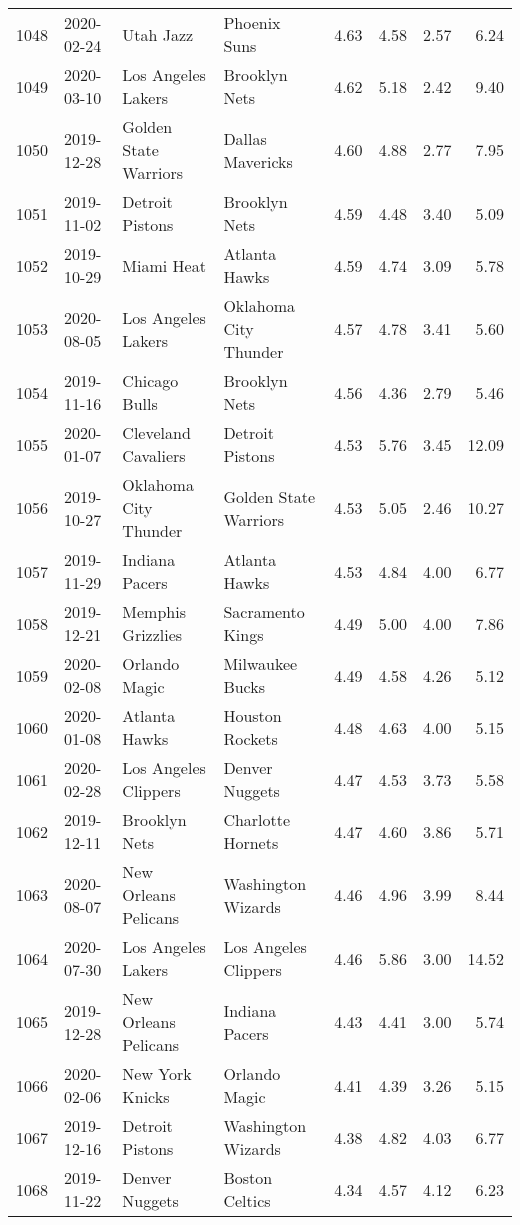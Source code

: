 \documentclass[
  11pt,
]{article}
\theoremstyle{nonumberplain}
\begin{document}
\begin{longtable}{rl|llr|rrr}
1048 & 2020-02-24 & Utah Jazz & Phoenix Suns & 4.63 & 4.58 & 2.57 & 6.24\\
1049 & 2020-03-10 & Los Angeles Lakers & Brooklyn Nets & 4.62 & 5.18 & 2.42 & 9.40\\
1050 & 2019-12-28 & Golden State Warriors & Dallas Mavericks & 4.60 & 4.88 & 2.77 & 7.95\\
1051 & 2019-11-02 & Detroit Pistons & Brooklyn Nets & 4.59 & 4.48 & 3.40 & 5.09\\
1052 & 2019-10-29 & Miami Heat & Atlanta Hawks & 4.59 & 4.74 & 3.09 & 5.78\\
1053 & 2020-08-05 & Los Angeles Lakers & Oklahoma City Thunder & 4.57 & 4.78 & 3.41 & 5.60\\
1054 & 2019-11-16 & Chicago Bulls & Brooklyn Nets & 4.56 & 4.36 & 2.79 & 5.46\\
1055 & 2020-01-07 & Cleveland Cavaliers & Detroit Pistons & 4.53 & 5.76 & 3.45 & 12.09\\
1056 & 2019-10-27 & Oklahoma City Thunder & Golden State Warriors & 4.53 & 5.05 & 2.46 & 10.27\\
1057 & 2019-11-29 & Indiana Pacers & Atlanta Hawks & 4.53 & 4.84 & 4.00 & 6.77\\
1058 & 2019-12-21 & Memphis Grizzlies & Sacramento Kings & 4.49 & 5.00 & 4.00 & 7.86\\
1059 & 2020-02-08 & Orlando Magic & Milwaukee Bucks & 4.49 & 4.58 & 4.26 & 5.12\\
1060 & 2020-01-08 & Atlanta Hawks & Houston Rockets & 4.48 & 4.63 & 4.00 & 5.15\\
1061 & 2020-02-28 & Los Angeles Clippers & Denver Nuggets & 4.47 & 4.53 & 3.73 & 5.58\\
1062 & 2019-12-11 & Brooklyn Nets & Charlotte Hornets & 4.47 & 4.60 & 3.86 & 5.71\\
1063 & 2020-08-07 & New Orleans Pelicans & Washington Wizards & 4.46 & 4.96 & 3.99 & 8.44\\
1064 & 2020-07-30 & Los Angeles Lakers & Los Angeles Clippers & 4.46 & 5.86 & 3.00 & 14.52\\
1065 & 2019-12-28 & New Orleans Pelicans & Indiana Pacers & 4.43 & 4.41 & 3.00 & 5.74\\
1066 & 2020-02-06 & New York Knicks & Orlando Magic & 4.41 & 4.39 & 3.26 & 5.15\\
1067 & 2019-12-16 & Detroit Pistons & Washington Wizards & 4.38 & 4.82 & 4.03 & 6.77\\
1068 & 2019-11-22 & Denver Nuggets & Boston Celtics & 4.34 & 4.57 & 4.12 & 6.23\\

\end{longtable}
\end{document}
